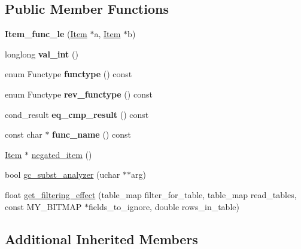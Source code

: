 \subsection*{Public Member Functions}
\begin{DoxyCompactItemize}
\item 
\mbox{\label{classItem__func__le_a72d240f58ed19d3d41c907a12951e9e9}} 
{\bfseries Item\+\_\+func\+\_\+le} (\mbox{\hyperlink{classItem}{Item}} $\ast$a, \mbox{\hyperlink{classItem}{Item}} $\ast$b)
\item 
\mbox{\label{classItem__func__le_a43b9ef3025b1fa17e536a9e911468eb4}} 
longlong {\bfseries val\+\_\+int} ()
\item 
\mbox{\label{classItem__func__le_ab21b5849ae0f8828613b5903207db47c}} 
enum Functype {\bfseries functype} () const
\item 
\mbox{\label{classItem__func__le_a04e24d9ead35b3ebe614fc7e617ef138}} 
enum Functype {\bfseries rev\+\_\+functype} () const
\item 
\mbox{\label{classItem__func__le_a9864abc0cd7d31fefadd2b2cbee3618a}} 
cond\+\_\+result {\bfseries eq\+\_\+cmp\+\_\+result} () const
\item 
\mbox{\label{classItem__func__le_a5eb919cf6f699a91c837af09737c230f}} 
const char $\ast$ {\bfseries func\+\_\+name} () const
\item 
\mbox{\hyperlink{classItem}{Item}} $\ast$ \mbox{\hyperlink{classItem__func__le_abb719e00bab4ec5c15f9567cf53c5ea5}{negated\+\_\+item}} ()
\item 
bool \mbox{\hyperlink{classItem__func__le_a1ee55d9e7ec7f51098181a95c377104e}{gc\+\_\+subst\+\_\+analyzer}} (uchar $\ast$$\ast$arg)
\item 
float \mbox{\hyperlink{classItem__func__le_a87166f592eb61ea3127bb9f00bca10d7}{get\+\_\+filtering\+\_\+effect}} (table\+\_\+map filter\+\_\+for\+\_\+table, table\+\_\+map read\+\_\+tables, const M\+Y\+\_\+\+B\+I\+T\+M\+AP $\ast$fields\+\_\+to\+\_\+ignore, double rows\+\_\+in\+\_\+table)
\end{DoxyCompactItemize}
\subsection*{Additional Inherited Members}


